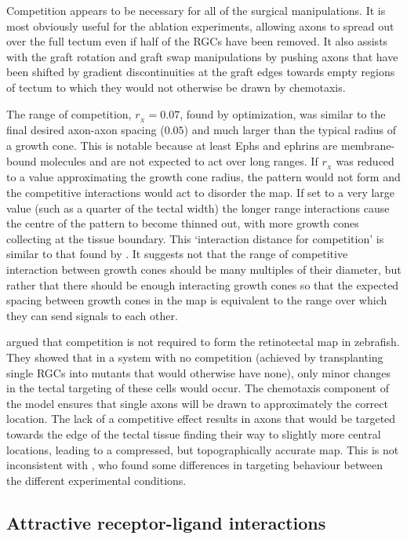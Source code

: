 \documentclass[9pt,lineno,draft]{elife}
\begin{document}
Competition appears to be necessary for all of the surgical manipulations.
It is most obviously useful for the ablation experiments, allowing axons to spread out over the full tectum even if half of the RGCs have been removed.
It also assists with the graft rotation and graft swap manipulations by pushing axons that have been shifted by gradient discontinuities at the graft edges towards empty regions of tectum to which they would not otherwise be drawn by chemotaxis.

The range of competition, $r_{\!_X}=0.07$, found by optimization, was similar to the final desired axon-axon spacing ($0.05$) and much larger than the typical radius of a growth cone. This is notable because at least Ephs and ephrins are membrane-bound molecules \citep{cang_developmental_2013} and are not expected to act over long ranges.
If $r_{\!_X}$ was reduced to a value approximating the growth cone radius, the pattern would not form and the competitive interactions would act to disorder the map.
If set to a very large value (such as a quarter of the tectal width) the longer range interactions cause the centre of the pattern to become thinned out, with more growth cones collecting at the tissue boundary.
This `interaction distance for competition' is similar to that found by \citet{simpson_simple_2011}.
It suggests not that the range of competitive interaction between growth cones should be many multiples of their diameter, but rather that there should be enough interacting growth cones so that the expected spacing between growth cones in the map is equivalent to the range over which they can send signals to each other.

\citet{gosse_retinotopic_2008} argued that competition is not required to form the retinotectal map in zebrafish. They showed that in a system with no competition (achieved by transplanting single RGCs into mutants that would otherwise have none), only minor changes in the tectal targeting of these cells would occur.
The chemotaxis component of the model ensures that single axons will be drawn to approximately the correct location.
The lack of a competitive effect results in axons that would be targeted towards the edge of the tectal tissue finding their way to slightly more central locations, leading to a compressed, but topographically accurate map.
This is not inconsistent with \citet{gosse_retinotopic_2008}, who found some differences in targeting behaviour between the different experimental conditions.

\subsection*{Attractive receptor-ligand interactions}
\end{document}
